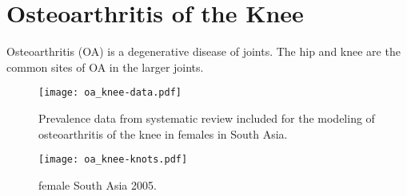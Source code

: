 \chapter{Osteoarthritis of the Knee}
\label{applications-con_fit_splines}

Osteoarthritis (OA) is a degenerative disease of joints. The hip and knee are the common sites of OA in the larger joints.

    \begin{figure}[h]
        \begin{center}
            \texttt{[image: oa\_knee-data.pdf]}
            \caption{Prevalence data from systematic review included for the modeling of osteoarthritis of the knee in females in South Asia.}
            \label{fig:app-oa knee data}
        \end{center}
    \end{figure}
    
    \begin{figure}[h]
        \begin{center}
            \texttt{[image: oa\_knee-knots.pdf]}
            \caption{female South Asia 2005.}
            \label{fig:app-oa knee knots}
        \end{center}
    \end{figure}